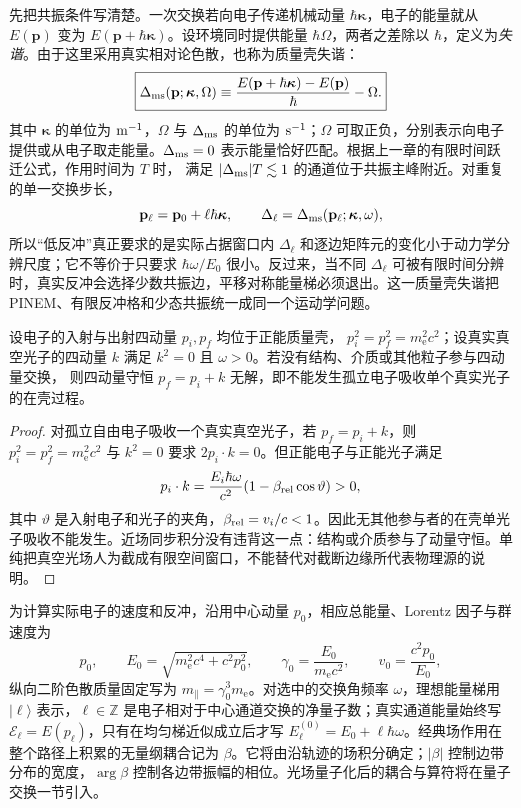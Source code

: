 先把共振条件写清楚。一次交换若向电子传递机械动量 $\hbar\boldsymbol\kappa$，电子的能量就从 $E(\mathbf p)$ 变为 $E(\mathbf p+\hbar\boldsymbol\kappa)$。设环境同时提供能量 $\hbar\Omega$，两者之差除以 $\hbar$，定义为\emph{失谐}。由于这里采用真实相对论色散，也称为质量壳失谐：
\begin{equation}
\boxed{
\Delta_{\rm ms}(\mathbf p;\boldsymbol\kappa,\Omega)
\equiv
\frac{
E(\mathbf p+\hbar\boldsymbol\kappa)-E(\mathbf p)
}{\hbar}
-\Omega .}
\label{eq:free_electron_exact_mass_shell_mismatch}
\end{equation}
其中 $\boldsymbol\kappa$ 的单位为 ${\rm m^{-1}}$，$\Omega$ 与 $\Delta_{\rm ms}$ 的单位为 ${\rm s^{-1}}$；$\Omega$ 可取正负，分别表示向电子提供或从电子取走能量。$\Delta_{\rm ms}=0$ 表示能量恰好匹配。根据上一章的有限时间跃迁公式，作用时间为 $T$ 时，
满足 $|\Delta_{\rm ms}|T\lesssim1$ 的通道位于共振主峰附近。对重复的单一交换步长，
\[
\mathbf p_\ell=\mathbf p_0+\ell\hbar\boldsymbol\kappa,
\qquad
\Delta_\ell
=
\Delta_{\rm ms}(\mathbf p_\ell;\boldsymbol\kappa,\omega),
\]
所以“低反冲”真正要求的是实际占据窗口内 $\Delta_\ell$ 和逐边矩阵元的变化小于动力学分辨尺度；它不等价于只要求 $\hbar\omega/E_0$ 很小。反过来，当不同 $\Delta_\ell$ 可被有限时间分辨时，真实反冲会选择少数共振边，平移对称能量梯必须退出。这一质量壳失谐把 PINEM、有限反冲格和少态共振统一成同一个运动学问题。

\begin{proposition}[孤立自由电子的单光子吸收禁戒]
设电子的入射与出射四动量 $p_i,p_f$ 均位于正能质量壳，
$p_i^2=p_f^2=m_{\mathrm e}^2c^2$；设真实真空光子的四动量 $k$ 满足
$k^2=0$ 且 $\omega>0$。若没有结构、介质或其他粒子参与四动量交换，
则四动量守恒 $p_f=p_i+k$ 无解，即不能发生孤立电子吸收单个真实光子的在壳过程。
\end{proposition}
\begin{proof}
对孤立自由电子吸收一个真实真空光子，若 $p_f=p_i+k$，则 $p_i^2=p_f^2=m_{\mathrm e}^2c^2$ 与 $k^2=0$ 要求 $2p_i\cdot k=0$。但正能电子与正能光子满足
\begin{equation*}
 p_i\cdot k=\frac{E_i\hbar\omega}{c^2}
 (1-\beta_{\rm rel}\cos\vartheta)>0,
\end{equation*}
其中 $\vartheta$ 是入射电子和光子的夹角，$\beta_{\rm rel}=v_i/c<1$。因此无其他参与者的在壳单光子吸收不能发生。近场同步积分没有违背这一点：结构或介质参与了动量守恒。单纯把真空光场人为截成有限空间窗口，不能替代对截断边缘所代表物理源的说明。
\end{proof}

为计算实际电子的速度和反冲，沿用中心动量 $p_0$，相应总能量、Lorentz 因子与群速度为
\begin{equation*}
 p_0,\qquad E_0=\sqrt{m_{\mathrm e}^2c^4+c^2p_0^2},\qquad
 \gamma_0=\frac{E_0}{m_{\mathrm e} c^2},\qquad
 v_0=\frac{c^2p_0}{E_0},
\end{equation*}
纵向二阶色散质量固定写为 $m_\parallel=\gamma_0^3m_{\mathrm e}$。对选中的交换角频率 $\omega$，理想能量梯用 $|\ell\rangle$ 表示，$\ell\in\mathbb Z$ 是电子相对于中心通道交换的净量子数；真实通道能量始终写 $\mathcal E_\ell=E(p_\ell)$，只有在均匀梯近似成立后才写 $E_\ell^{(0)}=E_0+\ell\hbar\omega$。经典场作用在整个路径上积累的无量纲耦合记为 $\beta$。它将由沿轨迹的场积分确定；$|\beta|$ 控制边带分布的宽度，$\arg\beta$ 控制各边带振幅的相位。光场量子化后的耦合与算符将在量子交换一节引入。

